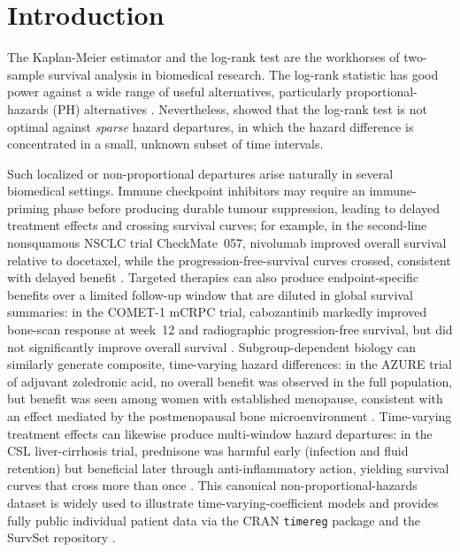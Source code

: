 \documentclass[unnumsec,webpdf,contemporary,large]{oup-authoring-template}
\begin{document}
\section{Introduction}

The Kaplan-Meier estimator \citep{kaplan1958} and the log-rank test
\citep{mantel1966} are the workhorses of two-sample survival analysis in
biomedical research. The log-rank statistic has good power against a wide
range of useful alternatives, particularly proportional-hazards (PH)
alternatives \citep{schoenfeld1981}. Nevertheless,
\citet{kipnis_biometrika} showed that the log-rank test is not optimal
against \emph{sparse} hazard departures, in which the hazard difference is
concentrated in a small, unknown subset of time intervals.

Such localized or non-proportional departures arise naturally in several
biomedical settings. Immune checkpoint inhibitors may require an
immune-priming phase before producing durable tumour suppression, leading
to delayed treatment effects and crossing survival curves; for example,
in the second-line nonsquamous NSCLC trial CheckMate~057, nivolumab
improved overall survival relative to docetaxel, while the
progression-free-survival curves crossed, consistent with delayed benefit
\citep{borghaei2015}. Targeted therapies can also produce endpoint-specific
benefits over a limited follow-up window that are diluted in global
survival summaries: in the COMET-1 mCRPC trial, cabozantinib markedly
improved bone-scan response at week~12 and radiographic
progression-free survival, but did not significantly improve overall
survival \citep{smith2016}. Subgroup-dependent biology can similarly
generate composite, time-varying hazard differences: in the AZURE trial
of adjuvant zoledronic acid, no overall benefit was observed in the full
population, but benefit was seen among women with established menopause,
consistent with an effect mediated by the postmenopausal bone
microenvironment \citep{coleman2011,coleman2014}.
Time-varying treatment effects can likewise produce multi-window hazard
departures: in the CSL liver-cirrhosis trial, prednisone was harmful early
(infection and fluid retention) but beneficial later through
anti-inflammatory action, yielding survival curves that cross more than once
\citep{csl_data}. This canonical non-proportional-hazards dataset is widely
used to illustrate time-varying-coefficient models and provides fully public
individual patient data via the CRAN \texttt{timereg} package
\citep{csl_data} and the SurvSet repository \citep{survset2022}.
\end{document}
